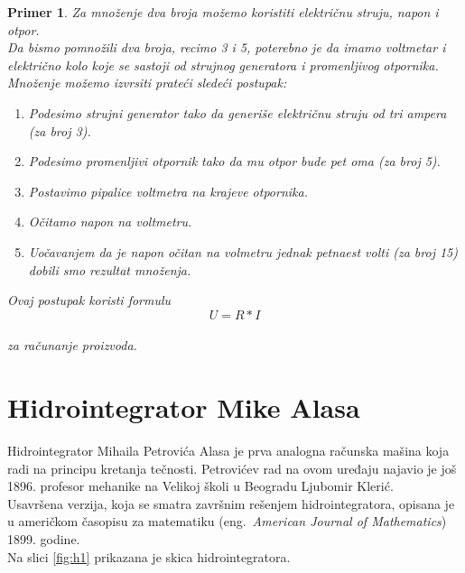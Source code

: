 \documentclass[a4paper]{article}
\newtheorem{primer}{Primer}[section]
\begin{document}
{    \begin{primer}
    Za množenje dva broja možemo koristiti električnu struju, napon i otpor.\\
    Da bismo pomnožili dva broja, recimo 3 i 5, poterebno je da imamo voltmetar i električno kolo koje se sastoji od strujnog generatora i promenljivog otpornika. Množenje možemo izvrsiti prateći sledeći postupak:\begin{enumerate}
        \item Podesimo strujni generator tako da generiše električnu struju od tri ampera (za broj 3).
        \item Podesimo promenljivi otpornik tako da mu otpor bude pet oma (za broj 5).
        \item Postavimo pipalice voltmetra na krajeve otpornika.
        \item Očitamo napon na voltmetru.
        \item Uočavanjem da je napon očitan na volmetru jednak petnaest volti (za broj 15) dobili smo rezultat množenja.
    \end{enumerate}
    \centering Ovaj postupak koristi formulu
    \centering $$ U = R*I $$\\
    \centering za računanje proizvoda.
    \end{primer}


\section{Hidrointegrator Mike Alasa}	
\label{sec:hidrointegrator}

Hidrointegrator Mihaila Petrovića Alasa je prva analogna računska mašina koja radi na principu kretanja tečnosti. Petrovićev rad na ovom uređaju najavio je još 1896. profesor mehanike na Velikoj školi u Beogradu Ljubomir Klerić.\\
Usavršena verzija, koja se smatra završnim rešenjem hidrointegratora, opisana je u američkom časopisu za matematiku (eng.~{\em American Journal of Mathematics}) 1899. godine.\cite{hidrointegrator}\\
Na slici \ref{fig:h1} prikazana je skica hidrointegratora. 

\bigskip

}
\end{document}
